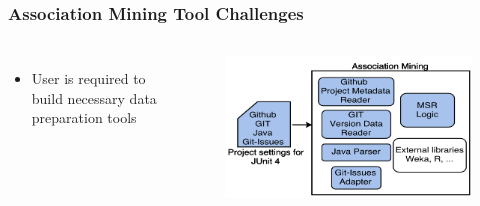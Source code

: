         \begin{frame}
            \frametitle{Association Mining Tool Challenges}
            \begin{columns}
                \begin{itemize}
                    \item User is required to build necessary data preparation tools
                 \end{itemize}
                 \begin{figure}
                    \centering
                        \includegraphics[width=0.85\linewidth]{figures/association.png}
                 \end{figure}
             \end{columns}
        \end{frame}

